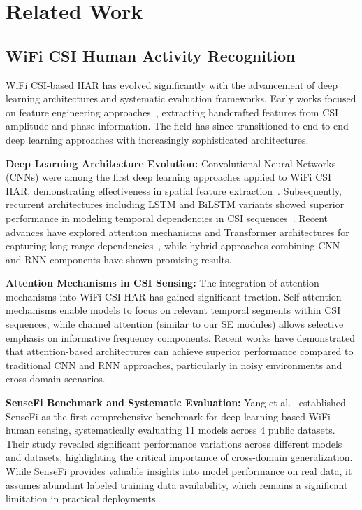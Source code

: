 
\section{Related Work}

\subsection{WiFi CSI Human Activity Recognition}

WiFi CSI-based HAR has evolved significantly with the advancement of deep learning architectures and systematic evaluation frameworks. Early works focused on feature engineering approaches~\cite{csi_basics2016}, extracting handcrafted features from CSI amplitude and phase information. The field has since transitioned to end-to-end deep learning approaches with increasingly sophisticated architectures.

\textbf{Deep Learning Architecture Evolution:} Convolutional Neural Networks (CNNs) were among the first deep learning approaches applied to WiFi CSI HAR, demonstrating effectiveness in spatial feature extraction~\cite{clnet2021}. Subsequently, recurrent architectures including LSTM and BiLSTM variants showed superior performance in modeling temporal dependencies in CSI sequences~\cite{rewis2022}. Recent advances have explored attention mechanisms and Transformer architectures for capturing long-range dependencies~\cite{autofi2022}, while hybrid approaches combining CNN and RNN components have shown promising results.

\textbf{Attention Mechanisms in CSI Sensing:} The integration of attention mechanisms into WiFi CSI HAR has gained significant traction. Self-attention mechanisms enable models to focus on relevant temporal segments within CSI sequences, while channel attention (similar to our SE modules) allows selective emphasis on informative frequency components. Recent works have demonstrated that attention-based architectures can achieve superior performance compared to traditional CNN and RNN approaches, particularly in noisy environments and cross-domain scenarios.

\textbf{SenseFi Benchmark and Systematic Evaluation:} Yang et al.~\cite{yang2023sensefi} established SenseFi as the first comprehensive benchmark for deep learning-based WiFi human sensing, systematically evaluating 11 models across 4 public datasets. Their study revealed significant performance variations across different models and datasets, highlighting the critical importance of cross-domain generalization. While SenseFi provides valuable insights into model performance on real data, it assumes abundant labeled training data availability, which remains a significant limitation in practical deployments.

